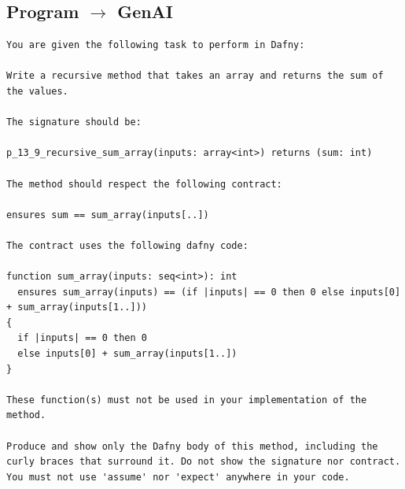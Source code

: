 \documentclass{article}
\begin{document}
\subsection*{Program $\rightarrow$ GenAI}
\begin{lstlisting}
You are given the following task to perform in Dafny:

Write a recursive method that takes an array and returns the sum of the values.

The signature should be:

p_13_9_recursive_sum_array(inputs: array<int>) returns (sum: int)

The method should respect the following contract:

ensures sum == sum_array(inputs[..])

The contract uses the following dafny code:

function sum_array(inputs: seq<int>): int
  ensures sum_array(inputs) == (if |inputs| == 0 then 0 else inputs[0] + sum_array(inputs[1..]))
{
  if |inputs| == 0 then 0
  else inputs[0] + sum_array(inputs[1..])
}

These function(s) must not be used in your implementation of the method.

Produce and show only the Dafny body of this method, including the curly braces that surround it. Do not show the signature nor contract. You must not use 'assume' nor 'expect' anywhere in your code.
\end{lstlisting}
\end{document}
